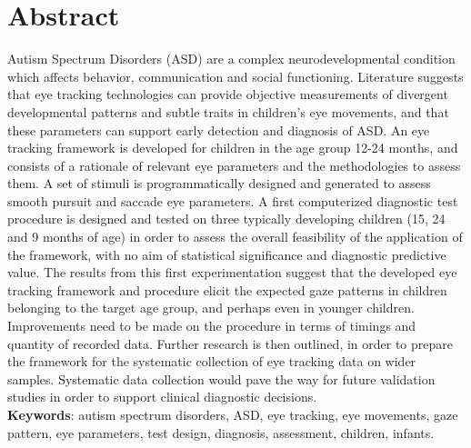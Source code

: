 \chapter*{Abstract}

Autism Spectrum Disorders (ASD) are a complex neurodevelopmental condition which affects behavior, communication and social functioning. Literature suggests that eye tracking technologies can provide objective measurements of divergent developmental patterns and subtle traits in children’s eye movements, and that these parameters can support early detection and diagnosis of ASD. An eye tracking framework is developed for children in the age group 12-24 months, and consists of a rationale of relevant eye parameters and the methodologies to assess them. A set of stimuli is programmatically designed and generated to assess smooth pursuit and saccade eye parameters. A first computerized diagnostic test procedure is designed and tested on three typically developing children (15,  24 and 9 months of age) in order to assess the overall feasibility of the application of the framework, with no aim of statistical significance and diagnostic predictive value. The results from this first experimentation suggest that the developed eye tracking framework and procedure elicit the expected gaze patterns in children belonging to the target age group, and perhaps even in younger children. Improvements need to be made on the procedure in terms of timings and quantity of recorded data. Further research is then outlined, in order to prepare the framework for the systematic collection of eye tracking data on wider samples. Systematic data collection would pave the way for future validation studies in order to support clinical diagnostic decisions.
\\[1cm]

\textbf{Keywords}: autism spectrum disorders, ASD, eye tracking, eye movements, gaze pattern, eye parameters, test design, diagnosis, assessment, children, infants.

\hypersetup{pageanchor=false}